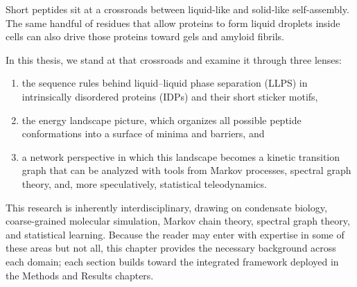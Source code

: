 Short peptides sit at a crossroads between liquid-like and solid-like self-assembly.
The same handful of residues that allow proteins to form liquid droplets inside cells
can also drive those proteins toward gels and amyloid fibrils.

In this thesis, we
stand at that crossroads and examine it through three lenses:

\begin{enumerate}
  \item the sequence rules behind liquid--liquid phase separation (LLPS) in
        intrinsically disordered proteins (IDPs) and their short sticker motifs,
  \item the energy landscape picture, which organizes all possible peptide
        conformations into a surface of minima and barriers, and
  \item a network perspective in which this landscape becomes a kinetic transition
        graph that can be analyzed with tools from Markov processes, spectral graph
        theory, and, more speculatively, statistical teleodynamics.
\end{enumerate}

This research is inherently interdisciplinary, drawing on condensate biology,
coarse-grained molecular simulation, Markov chain theory, spectral graph theory,
and statistical learning. Because the reader may enter with expertise in some of
these areas but not all, this chapter provides the necessary background across
each domain; each section builds toward the integrated framework deployed in the
Methods and Results chapters.

